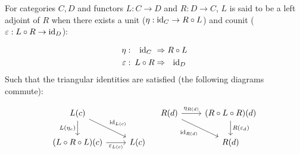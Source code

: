 \begin{definition}
  For categories $C,D$ and functors $L: C\to D$ and $R: D\to C$, $L$ is said to
  be a left adjoint of $R$ when there exists a unit ($\eta: \mathrm{id}_C\to R\circ L$)
  and counit ($\varepsilon: L\circ R \to \mathrm{id}_D$):
  \parencite{leinster:basic_category_theory}

  \[
    \begin{aligned}
      \eta:&\!\!\!&\mathrm{id}_C\ &\Rightarrow R \circ L\\
      \varepsilon:&\!\!\!& L \circ R &\Rightarrow\ \ \mathrm{id}_D
    \end{aligned}
  \]
  Such that the triangular identities are satisfied (the following diagrams
  commute):

  \[\begin{tikzcd}[ampersand replacement=\&]
    {L(c)} \\
    {(L\circ R\circ L)(c)} \& {L(c)}
    \arrow["{L(\eta_c)}"', from=1-1, to=2-1]
    \arrow["{\varepsilon_{L(c)}}"', from=2-1, to=2-2]
    \arrow["{\id_{L(c)}}", from=1-1, to=2-2]
  \end{tikzcd}
  \quad
  \begin{tikzcd}[ampersand replacement=\&]
    {R(d)} \& {(R\circ L\circ R)(d)} \\
    \& {R(d)}
    \arrow["{\eta_{R(d)}}", from=1-1, to=1-2]
    \arrow["{R(\varepsilon_d)}", from=1-2, to=2-2]
    \arrow["{\id_{R(d)}}"', from=1-1, to=2-2]
  \end{tikzcd}\]
\end{definition}

